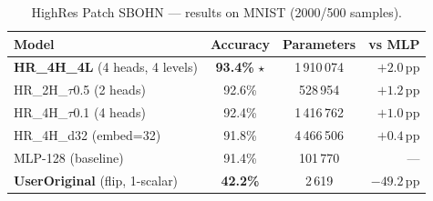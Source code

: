 \begin{table}[h]
\centering
\caption{HighRes Patch SBOHN --- results on MNIST (2000/500 samples).}
\begin{tabular}{lccr}
\hline
\textbf{Model} & \textbf{Accuracy} & \textbf{Parameters} & \textbf{vs MLP} \\
\hline
\textbf{HR\_4H\_4L} (4 heads, 4 levels) & \textbf{93.4\%} $\star$ & 1\,910\,074 & $+2.0$\,pp \\
HR\_2H\_$\tau$0.5 (2 heads)              & 92.6\%                  & 528\,954   & $+1.2$\,pp \\
HR\_4H\_$\tau$0.1 (4 heads)              & 92.4\%                  & 1\,416\,762 & $+1.0$\,pp \\
HR\_4H\_d32 (embed=32)                     & 91.8\%                  & 4\,466\,506 & $+0.4$\,pp \\
MLP-128 (baseline)                          & 91.4\%                  & 101\,770   & --- \\
\textbf{UserOriginal} (flip, 1-scalar)      & \textbf{42.2\%}         & 2\,619     & $-49.2$\,pp \\
\hline
\end{tabular}
\end{table}
